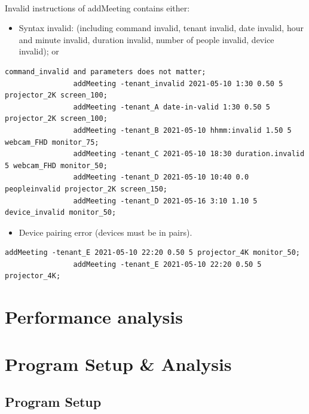 \documentclass{article}
\begin{document}
            \paragraph{}
            Invalid instructions of addMeeting contains either:
            
            \begin{itemize}
            \item Syntax invalid: (including command invalid, tenant invalid, date invalid, hour and minute invalid,
            duration invalid, number of people invalid, device invalid); or
            \end{itemize}
            
            \begin{Verbatim}[gobble=8]
                command_invalid and parameters does not matter;
                addMeeting -tenant_invalid 2021-05-10 1:30 0.50 5 projector_2K screen_100;
                addMeeting -tenant_A date-in-valid 1:30 0.50 5 projector_2K screen_100;
                addMeeting -tenant_B 2021-05-10 hhmm:invalid 1.50 5 webcam_FHD monitor_75;
                addMeeting -tenant_C 2021-05-10 18:30 duration.invalid 5 webcam_FHD monitor_50;
                addMeeting -tenant_D 2021-05-10 10:40 0.0 peopleinvalid projector_2K screen_150;
                addMeeting -tenant_D 2021-05-16 3:10 1.10 5 device_invalid monitor_50;
            \end{Verbatim}
            \begin{itemize}
            \item Device pairing error (devices must be in pairs).
            \end{itemize}
            \begin{Verbatim}[gobble=8]
                addMeeting -tenant_E 2021-05-10 22:20 0.50 5 projector_4K monitor_50; 
                addMeeting -tenant_E 2021-05-10 22:20 0.50 5 projector_4K; 
            \end{Verbatim}
        

    \cleardoublepage
    \section{Performance analysis}

    \cleardoublepage
    \section{Program Setup \& Analysis}
        \subsection{Program Setup}
\end{document}
